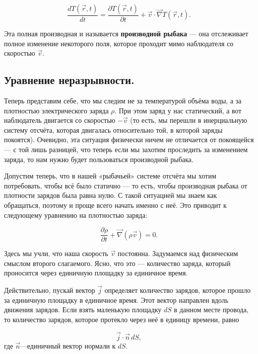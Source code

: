 \documentclass[a4paper,12pt]{article}
\numberwithin{equation}{section}
\newcommand{\pt}{\partial}
\newcommand{\vn}{\vec{\nabla}}
\begin{document}
\begin{equation}
  \label{eq:def_material_derivative}
  \frac{d T(\vec{r},t)}{dt} = \frac{\pt T (\vec{r},t)}{\pt t} +
  \vec{v} \cdot \vn T (\vec{r},t).
\end{equation}

Эта полная производная и называется \textbf{производной рыбака} — она
отслеживает полное изменение некоторого поля, которое проходит мимо
наблюдателя со скоростью $\vec{v}$. 

\subsection{Уравнение неразрывности.}
\label{sec:cont_eq}

Теперь представим себе, что мы следим не за температурой объёма воды,
а за плотностью электрического заряда $\rho$. При этом заряд у нас
статический, а вот наблюдатель двигается со скоростью $-\vec{v}$ (то
есть, мы перешли в инерциальную систему отсчёта, которая двигалась
относительно той, в которой заряды покоятся). Очевидно, эта ситуация
физически ничем не отличается от покоящейся — с той лишь разницей, что
теперь если мы захотим проследить за изменением заряда, то нам нужно
будет пользоваться производной рыбака. 

Допустим теперь, что в нашей «рыбачьей» системе отсчёта мы хотим
потребовать, чтобы всё было статично — то есть, чтобы производная
рыбака от плотности зарядов была равна нулю. С такой ситуацией мы
знаем как обращаться, поэтому и проще всего начать именно с неё. Это
приводит к следующему уравнению на плотностью заряда: 

\begin{equation}
  \label{eq:cont_charge_1}
  \frac{\pt \rho}{\pt t} + \vn ( \rho \vec{v}) =0.
\end{equation}

Здесь мы учли, что наша скорость $\vec{v}$ постоянна. Задумаемся над
физическим смыслом второго слагаемого. Ясно, что это — количество
заряда, который проносится через единичную площадку за единичное
время. 

Действительно, пускай вектор $\vec{j}$ определяет количество зарядов,
которое прошло за единичную площадку в единичное время. Этот вектор
направлен вдоль движения зарядов. Если взять маленькую площадку $dS$ в
данном месте провода, то количество зарядов, которое протекло через
неё в единицу времени, равно

\begin{equation}
  \label{eq:def_j_1}
  \vec{j} \cdot \vec{n}\, dS,
\end{equation}
где $\vec{n}$---единичный вектор нормали к $dS$. 
\end{document}
